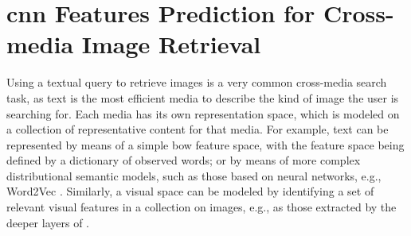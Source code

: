 
\graphicspath{{img/t2v/}}

\def\t{\mathbf{t}} %
\def\s{\mathbf{s}} %
\def\e{\mathbf{e}} %
\def\E{\mathbf{E}} %

\newcommand{\ttv}{\textsc{Text2Vis}}
\newcommand{\sparsettv}{\textsc{S-Text2Vis}}
\newcommand{\densettv}{\textsc{D-Text2Vis}}
\newcommand{\widedeepttv}{\textsc{W\&D-Text2Vis}}
\newcommand{\visreg}{\textsc{VisReg}}
\newcommand{\wordvisual}{\textsc{Word2VisualVec}}
\newcommand{\resnet}{\gls{resnet}-152}

\chapter{\gls{cnn} Features Prediction for Cross-media Image Retrieval}
\label{ch:text2vis}


Using a textual query to retrieve images is a very common cross-media search task, as text is the most efficient media to describe the kind of image the user is searching for.
Each media has its own representation space, which is modeled on a collection of representative content for that media.
For example, text can be represented by means of a simple \acrlong{bow} feature space, with the feature space being defined by a dictionary of observed words; or by means of more complex distributional semantic models, such as those based on neural networks, e.g., Word2Vec \cite{mikolov2013distributed}.
Similarly, a visual space can be modeled by identifying a set of relevant visual features in a collection on images, e.g., as those extracted by the deeper layers of  \cite{krizhevsky2012imagenet}.

